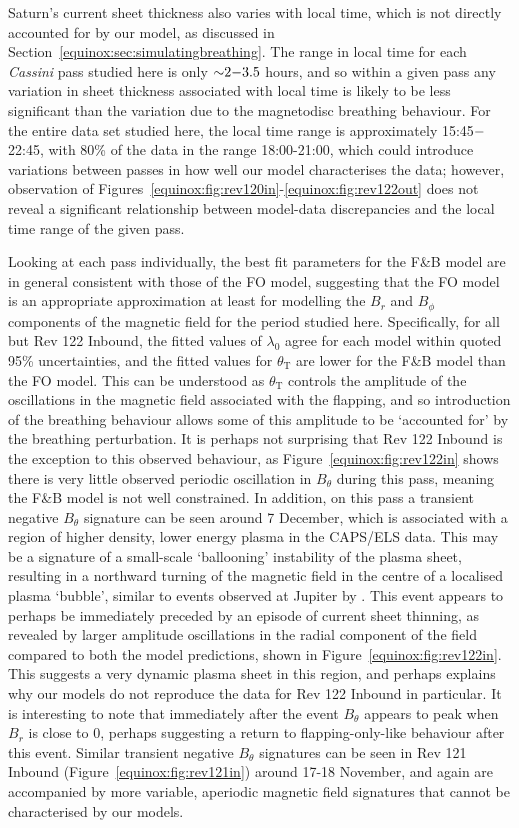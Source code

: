 Saturn's current sheet thickness also varies with local time, which is not directly accounted for by our model, as discussed in Section~\ref{equinox:sec:simulatingbreathing}. The range in local time for each \textit{Cassini} pass studied here is only ${\sim}2{\--}3.5$ hours, and so within a given pass any variation in sheet thickness associated with local time is likely to be less significant than the variation due to the magnetodisc breathing behaviour. For the entire data set studied here, the local time range is approximately 15:45${\--}$22:45, with 80\% of the data in the range 18:00-21:00, which could introduce variations between passes in how well our model characterises the data; however, observation of Figures~\ref{equinox:fig:rev120in}-\ref{equinox:fig:rev122out} does not reveal a significant relationship between model-data discrepancies and the local time range of the given pass.

Looking at each pass individually, the best fit parameters for the F{\&}B model are in general consistent with those of the FO model, suggesting that the FO model is an appropriate approximation at least for modelling the $B_{r}$ and $B_{\phi}$ components of the magnetic field for the period studied here. Specifically, for all but Rev 122 Inbound, the fitted values of $\lambda_0$ agree for each model within quoted 95\% uncertainties, and the fitted values for $\theta_\mathrm{T}$ are lower for the F{\&}B model than the FO model. This can be understood as $\theta_\mathrm{T}$ controls the amplitude of the oscillations in the magnetic field associated with the flapping, and so introduction of the breathing behaviour allows some of this amplitude to be `accounted for' by the breathing perturbation. It is perhaps not surprising that Rev 122 Inbound is the exception to this observed behaviour, as Figure~\ref{equinox:fig:rev122in} shows there is very little observed periodic oscillation in $B_{\theta}$ during this pass, meaning the F{\&}B model is not well constrained. In addition, on this pass a transient negative $B_{\theta}$ signature can be seen around 7 December, which is associated with a region of higher density, lower energy plasma in the CAPS/ELS data. This may be a signature of a small-scale `ballooning' instability of the plasma sheet, resulting in a northward turning of the magnetic field in the centre of a localised plasma `bubble', similar to events observed at Jupiter by {\citet{kivelson2005}. This event appears to perhaps be immediately preceded by an episode of current sheet thinning, as revealed by larger amplitude oscillations in the radial component of the field compared to both the model predictions, shown in Figure~\ref{equinox:fig:rev122in}.} This suggests a very dynamic plasma sheet in this region, and perhaps explains why our models do not reproduce the data for Rev 122 Inbound in particular. It is interesting to note that immediately after the event $B_\theta$ appears to peak when $B_r$ is close to 0, perhaps suggesting a return to flapping-only-like behaviour after this event. Similar transient negative $B_\theta$ signatures can be seen in Rev 121 Inbound (Figure~\ref{equinox:fig:rev121in}) around 17{\--}18 November, and again are accompanied by more variable, aperiodic magnetic field signatures that cannot be characterised by our models.

